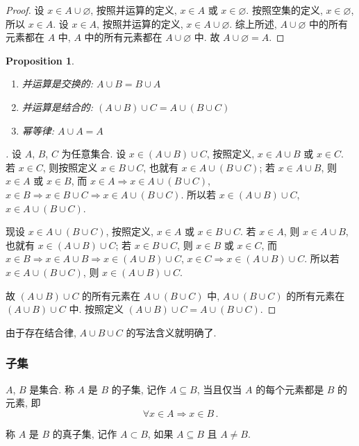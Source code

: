 \documentclass[UTF8]{ctexart}
\theoremstyle{mystyle}
\newtheorem{proposition}{Proposition}[section]
\theoremstyle{myremark}
\theoremstyle{plain}
\begin{document}
\begin{proof}
    设 $ x \in A \cup \varnothing $, 按照并运算的定义, $ x \in A $ 或 $ x \in \varnothing $. 按照空集的定义, $ x \in \varnothing $, 所以 $ x \in A $. 设 $ x \in A $, 按照并运算的定义, $ x \in A \cup \varnothing $. 综上所述, $ A \cup \varnothing $ 中的所有元素都在 $ A $ 中, $ A $ 中的所有元素都在 $ A \cup \varnothing $ 中. 故 $ A \cup \varnothing = A $.
\end{proof}


\begin{proposition} \ 
    \begin{enumerate}
        \item 并运算是交换的: $ A \cup B = B \cup A $
        \item 并运算是结合的: $ (A \cup B) \cup C = A \cup (B \cup C) $
        \item 幂等律: $ A \cup A = A $
    \end{enumerate}
\end{proposition}

\begin{proof}[]
    设 $ A $, $ B $, $ C $ 为任意集合. 设 $ x \in (A \cup B) \cup C $, 按照定义, $ x \in A \cup B $ 或 $ x \in C $. 若 $ x \in C $, 则按照定义 $ x \in B \cup C $, 也就有 $ x \in A \cup (B \cup C) $; 若 $ x \in A \cup B $, 则 $ x \in A $ 或 $ x \in B $, 而 $ x \in A \Longrightarrow x \in A \cup (B \cup C) $, $ x \in B \Longrightarrow x \in B \cup C \Longrightarrow x \in A \cup (B \cup C) $. 所以若 $ x \in (A \cup B) \cup C $, $ x \in A \cup (B \cup C) $.

    现设 $ x \in A \cup (B \cup C) $, 按照定义, $ x \in A $ 或 $ x \in B \cup C $. 若 $ x \in A $, 则 $ x \in A \cup B $, 也就有 $ x \in (A \cup B) \cup C $; 若 $ x \in B \cup C $, 则 $ x \in B $ 或 $ x \in C $, 而 $ x \in B \Longrightarrow x \in A \cup B \Longrightarrow x \in (A \cup B) \cup C $, $ x \in C \Longrightarrow x \in (A \cup B) \cup C $. 所以若 $ x \in A \cup (B \cup C) $, 则 $ x \in (A \cup B) \cup C $.

    故 $ (A \cup B) \cup C $ 的所有元素在 $ A \cup (B \cup C) $ 中, $ A \cup (B \cup C) $ 的所有元素在 $ (A \cup B) \cup C $ 中. 按照定义 $ (A \cup B) \cup C = A \cup (B \cup C) $.
\end{proof}

由于存在结合律, $ A \cup B \cup C $ 的写法含义就明确了.


\subsubsection{子集}
\begin{definition}[\text{子集}]
    $ A $, $ B $ 是集合. 称 $ A $ 是 $ B $ 的子集, 记作 $ A \subseteq B $, 当且仅当 $ A $ 的每个元素都是 $ B $ 的元素, 即 \[ \forall x \in A \Longrightarrow x \in B \,.\]

    称 $ A $ 是 $ B $ 的真子集, 记作 $ A \subset B $, 如果 $ A \subseteq B $ 且 $ A \neq B $. 
\end{definition}
\end{document}
